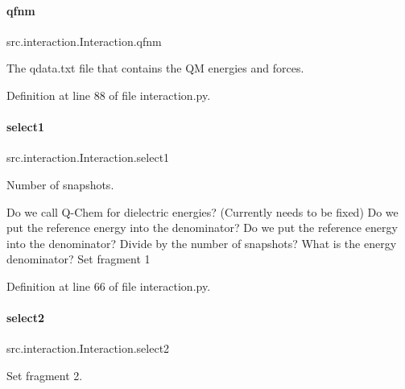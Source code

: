\paragraph{\texorpdfstring{qfnm}{qfnm}}
{\footnotesize\ttfamily src.\+interaction.\+Interaction.\+qfnm}



The qdata.\+txt file that contains the QM energies and forces. 



Definition at line 88 of file interaction.\+py.

\mbox{\label{classsrc_1_1interaction_1_1Interaction_a63eb069ad104da75714f27b0d7a7a3d0}} 
\paragraph{\texorpdfstring{select1}{select1}}
{\footnotesize\ttfamily src.\+interaction.\+Interaction.\+select1}



Number of snapshots. 

Do we call Q-\/\+Chem for dielectric energies? (Currently needs to be fixed) Do we put the reference energy into the denominator? Do we put the reference energy into the denominator? Divide by the number of snapshots? What is the energy denominator? Set fragment 1 

Definition at line 66 of file interaction.\+py.

\mbox{\label{classsrc_1_1interaction_1_1Interaction_ae1076300eeaacf9a332d271ccc649c42}} 
\paragraph{\texorpdfstring{select2}{select2}}
{\footnotesize\ttfamily src.\+interaction.\+Interaction.\+select2}



Set fragment 2. 



